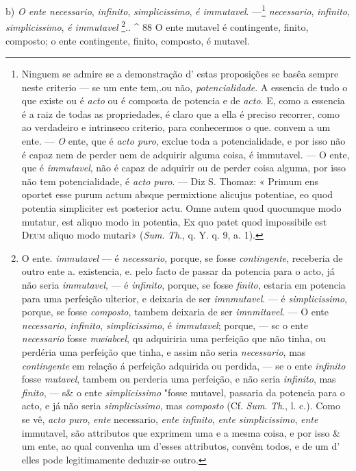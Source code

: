 b) \emph{O ente necessario}, \emph{infinito}, \emph{simplicissimo}, \emph{é immutavel}. ---\footnote{Ninguem se admire se a demonstração d' estas proposições se basêa sempre neste criterio --- se um ente tem,.ou não, \emph{potencialidade}. A essencia de tudo o que existe ou é \emph{acto} ou é composta de potencia e de \emph{acto}. E, como a essencia é a raiz de todas as propriedades, é claro que a ella é preciso recorrer, como ao verdadeiro e intrinseco criterio, para conhecermos o que. convem a um ente. --- \emph{O} ente, que é \emph{acto puro}, exclue toda a potencialidade, e por isso não é capaz nem de perder nem de adquirir alguma coisa, é immutavel. --- O ente, que é \emph{immutavel}, não é capaz de adquirir ou de perder coisa alguma, por isso não tem potencialidade, é \emph{acto puro}. --- Diz S. Thomaz: « Primum ens oportet esse purum actum absque permixtione alicujus potentiae, eo quod potentia simpliciter est posterior actu. Omne autem quod quocumque modo mutatur, est aliquo modo in potentia, Ex quo patet quod impossibile est \textsc{Deum} aliquo modo mutari» (\emph{Sum}. \emph{Th}., q. Y. q. 9, a. 1).}  \emph{necessario}, \emph{infinito}, \emph{simplicissimo}, \emph{é immutavel} \footnote{O ente. \emph{immutavel} --- é \emph{necessario}, porque, se fosse \emph{contingente}, receberia de outro ente a. existencia, e. pelo facto de passar da potencia para o acto, já não seria \emph{immutavel}, --- é \emph{infinito}, porque, se fosse \emph{finito}, estaria em potencia para uma perfeição ulterior, e deixaria de ser \emph{imnmutavel}. --- é \emph{simplicissimo}, porque, se fosse \emph{composto}, tambem deixaria de ser \emph{imnmitavel}. --- O ente \emph{necessario}, \emph{infinito}, \emph{simplicissimo}, é \emph{immutavel}; porque, --- sc o ente \emph{necessario} fosse \emph{mwiabcel}, qu adquiriria uma perfeição que não tinha, ou perdéria uma perfeição que tinha, e assim não seria \emph{necessario}, mas \emph{contingente} em relação á perfeição adquirida ou perdida, --- se o ente \emph{infinito} fosse \emph{mutavel}, tambem ou perderia uma perfeição, e não seria \emph{infinito}, mas \emph{finito}, --- s\& o ente \emph{simplicissimo} "fosse mutavel, passaria da potencia para o acto, e já não seria \emph{simplicissimo}, mas \emph{composto} (Cf. \emph{Sum}. \emph{Th}., l. c.). Como se vê, \emph{acto puro}, \emph{ente} necessario, \emph{ente infinito}, \emph{ente simplicissimo}, \emph{ente} immutavel, são attributos que exprimem uma e a mesma coisa, e por isso \& um ente, ao qual convenha um d'esses attributos, convêm todos, e de um d' elles pode legitimamente deduzir-se outro.}.. \textasciicircum{} 88 O ente mutavel é contingente, finito, composto; o ente contingente, finito, composto, é mutavel.


